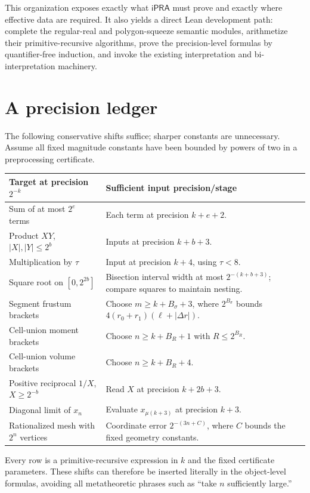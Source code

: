 \documentclass[11pt]{article}
\theoremstyle{definition}
\newcommand{\ipra}{\mathsf{iPRA}}
\newcommand{\code}[1]{\texttt{\detokenize{#1}}}
\newcommand{\abs}[1]{\left|#1\right|}
\begin{document}
This organization exposes exactly what $\ipra$ must prove and exactly where
effective data are required.  It also yields a direct Lean development path:
complete the regular-real and polygon-squeeze semantic modules, arithmetize
their primitive-recursive algorithms, prove the precision-level formulas by
quantifier-free induction, and invoke the existing
\code{ConciseIPRA} interpretation and bi-interpretation machinery.

\appendix

\section{A precision ledger}
\label{app:precision}

The following conservative shifts suffice; sharper constants are unnecessary.
Assume all fixed magnitude constants have been bounded by powers of two in a
preprocessing certificate.

\begin{longtable}{@{}p{}p{}@{}}
\toprule
Target at precision $2^{-k}$ & Sufficient input precision/stage \\
\midrule
Sum of at most $2^e$ terms & Each term at precision $k+e+2$.\\
Product $XY$, $\abs X,\abs Y\leq2^b$ & Inputs at precision $k+b+3$.\\
Multiplication by $\tau$ & Input at precision $k+4$, using $\tau<8$.\\
Square root on $[0,2^{2b}]$ & Bisection interval width at most
$2^{-(k+b+3)}$; compare squares to maintain nesting.\\
Segment frustum brackets & Choose $m\geq k+B_\sigma+3$, where
$2^{B_\sigma}$ bounds
$4(r_0+r_1)(\ell+\abs{\Delta r})$.\\
Cell-union moment brackets & Choose $n\geq k+B_R+1$ with $R\leq2^{B_R}$.\\
Cell-union volume brackets & Choose $n\geq k+B_R+4$.\\
Positive reciprocal $1/X$, $X\geq2^{-b}$ & Read $X$ at precision
$k+2b+3$.\\
Diagonal limit of $x_n$ & Evaluate $x_{\mu(k+3)}$ at precision $k+3$.\\
Rationalized mesh with $2^n$ vertices & Coordinate error
$2^{-(3n+C)}$, where $C$ bounds the fixed geometry constants.\\
\bottomrule
\end{longtable}

Every row is a primitive-recursive expression in $k$ and the fixed
certificate parameters.  These shifts can therefore be inserted literally in
the object-level formulas, avoiding all metatheoretic phrases such as
``take $n$ sufficiently large.''
\end{document}
